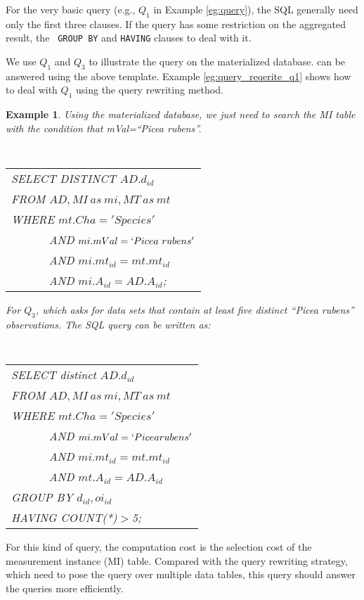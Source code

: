 \documentclass[conference]{IEEEtran}
\newtheorem{example}{\bf Example}[section]
\begin{document}
For the very basic query (e.g., $Q_1$ in Example \ref{eg:query}), the
SQL generally need only the first three clauses. 
If the query has some restriction on the aggregated result, the {\tt
  GROUP BY} and {\tt HAVING} clauses to deal with it. 

We use $Q_1$ and $Q_3$ to illustrate the query on the materialized
database. 
can be answered using the above
template. 
Example \ref{eg:query_reqerite_q1} shows how to deal with $Q_1$ using
the query rewriting method. 

\begin{example} \label{eg:materialize_db_q1}
Using the  materialized database,  we just need to search the MI table
with the condition that {\em mVal=``Picea rubens''}.

\vspace{0.1in}
{\tt 
\begin{tabular}{l}
SELECT DISTINCT $AD.d_{id}$\\
FROM $AD, MI~as~mi, MT~as~mt$\\ 
WHERE $mt.Cha='Species'$ \\
$\qquad\quad$ AND $mi.mVal = `Picea~rubens'$\\
$\qquad\quad$ AND $mi.mt_{id}=mt.mt_{id}$\\
$\qquad\quad$ AND $mi.A_{id}=AD.A_{id}$; 
\end{tabular}
}
\vspace{0.1in}

For $Q_3$, which asks for data sets that contain at
least five distinct ``Picea rubens'' observations.
The SQL query can be written as: 

\vspace{0.1in}
{\tt 
\begin{tabular}{l}
SELECT distinct $AD.d_{id}$\\
FROM $AD, MI~as~mi, MT~as~mt$\\
WHERE $mt.Cha='Species'$ \\
$\qquad\quad$ AND $mi.mVal = `Picea rubens'$\\
$\qquad\quad$ AND $mi.mt_{id}=mt.mt_{id}$\\
$\qquad\quad$ AND $mt.A_{id}=AD.A_{id}$\\
GROUP BY $d_{id},oi_{id}$\\
HAVING COUNT(*)$>$5; 
}
\end{tabular}
}
\vspace{0.1in}
\end{example}

For this kind of query, the computation cost is the selection cost of the
measurement instance (MI) table. 
Compared with the query rewriting strategy, which need to pose the
query over multiple data tables, this query should answer the queries
more efficiently. 
\end{document}
